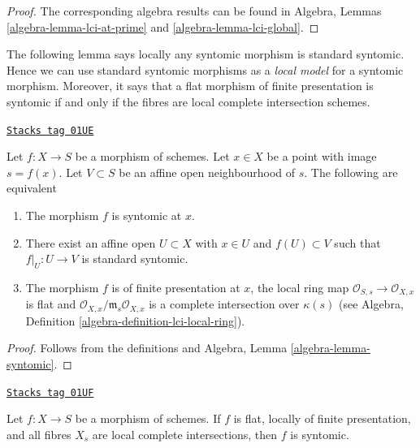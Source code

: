 \begin{proof}
The corresponding algebra results can be found in
Algebra, Lemmas \ref{algebra-lemma-lci-at-prime} and
\ref{algebra-lemma-lci-global}.
\end{proof}

The following lemma says locally any syntomic morphism is standard syntomic.
Hence we can use standard syntomic morphisms as a {\it local model}
for a syntomic morphism. Moreover, it says that a flat morphism of finite
presentation is syntomic if and only if the fibres are local complete
intersection schemes.

\begin{lemma}
\label{morphisms-lemma-syntomic-locally-standard-syntomic}
\href{https://stacks.math.columbia.edu/tag/01UE}{\texttt{Stacks tag 01UE}}

Let $f : X  \to S$ be a morphism of schemes. Let $x \in X$ be a point
with image $s = f(x)$. Let $V \subset S$ be an affine open neighbourhood
of $s$. The following are equivalent
\begin{enumerate}
\item The morphism $f$ is syntomic at $x$.
\item There exist an affine open $U \subset X$ with $x \in U$ and
$f(U) \subset V$ such that $f|_U : U \to V$ is standard syntomic.
\item The morphism $f$ is of finite presentation at $x$, the local ring map
$\mathcal{O}_{S, s} \to \mathcal{O}_{X, x}$
is flat and $\mathcal{O}_{X, x}/\mathfrak m_s \mathcal{O}_{X, x}$
is a complete intersection over $\kappa(s)$ (see
Algebra, Definition \ref{algebra-definition-lci-local-ring}).
\end{enumerate}
\end{lemma}

\begin{proof}
Follows from the definitions and
Algebra, Lemma \ref{algebra-lemma-syntomic}.
\end{proof}

\begin{lemma}
\label{morphisms-lemma-syntomic-flat-fibres}
\href{https://stacks.math.columbia.edu/tag/01UF}{\texttt{Stacks tag 01UF}}

Let $f : X \to S$ be a morphism of schemes.
If $f$ is flat, locally of finite presentation, and all
fibres $X_s$ are local complete intersections, then $f$
is syntomic.
\end{lemma}

